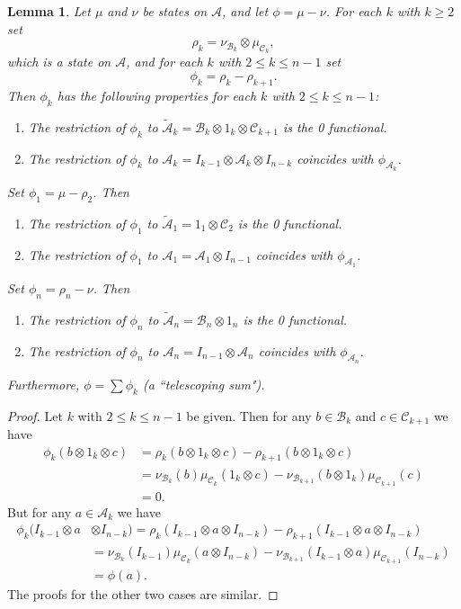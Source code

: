 \documentclass{amsart}[14pt]
\newtheorem{lemma}[theorem]{Lemma}
\theoremstyle{definition}
\theoremstyle{remark}
\newcommand{\cA}{{\mathcal A}}
\newcommand{\cB}{{\mathcal B}}
\newcommand{\cC}{{\mathcal C}}
\newcommand{\<}{\langle}
\renewcommand{\>}{\rangle}
\numberwithin{equation}{section}
\begin{document}
{\begin{lemma}
\label{lemsum}
Let $\mu$ and $\nu$ be states on $\cA$, and let $\phi = \mu - \nu$. 
For each $k$ with $k \geq 2$ set
\[
\rho_k = \nu_{\cB_k} \otimes \mu _{\cC_k},
\] 
which is a state on $\cA$,
and for each $k$ with $2 \leq k \leq n-1$ set
\[
 \phi_k = \rho_k - \rho_{k+1}.
 \]
Then $\phi_k$ has the following properties for 
each $k$ with $2 \leq k \leq n-1$:
\begin{enumerate}
\item
The restriction of $\phi_k$ to 
$\tilde \cA_k = \cB_k \otimes 1_k \otimes \cC_{k+1}$ is the
0 functional.
\item
The restriction of $\phi_k$ to $\cA_k = I_{k-1} \otimes \cA_k \otimes I_{n-k}$ coincides
with $\phi_{\cA_k}$.
\end{enumerate}
Set $\phi_1 = \mu - \rho_2$. Then
\begin{enumerate}
\item
The restriction of $\phi_1$ to $\tilde \cA_1 = 1_1 \otimes \cC_{2}$ is the
0 functional.
\item
The restriction of $\phi_1$ to $\cA_1 = \cA_1 \otimes I_{n-1}$ coincides
with $\phi_{\cA_1}$.
\end{enumerate}
Set $\phi_n = \rho_n  - \nu$. Then
\begin{enumerate}
\item
The restriction of $\phi_n$ to $\tilde \cA_n = \cB_n \otimes 1_n$ is the
0 functional.
\item
The restriction of $\phi_n$ to $\cA_n =  I_{n-1} \otimes  \cA_n$ coincides
with $\phi_{\cA_n}$.
\end{enumerate}
Furthermore, $\phi = \sum \phi_k$ (a ``telescoping sum").
\end{lemma}

\begin{proof}
Let $k$ with $2 \leq k \leq n-1$ be given. Then for any $b \in \cB_k$
and $c \in \cC_{k+1}$ we have
\begin{align*}
\phi_k(b \otimes 1_k \otimes c) & = \rho_k(b \otimes 1_k \otimes c)
- \rho_{k+1}(b \otimes 1_k \otimes c)    \\
& = \nu_{\cB_k}(b)\mu_{\cC_k}(1_k \otimes c)
-  \nu_{\cB_{k+1}}(b \otimes 1_k )\mu_{\cC_{k+1}}(c)   \\
& =0   .
\end{align*}
But for any $a \in \cA_k$ we have
\begin{align*}
\phi_k(I_{k-1}\otimes a & \otimes I_{n-k})  = \rho_k(I_{k-1}\otimes a \otimes I_{n-k})
- \rho_{k+1}(I_{k-1}\otimes a \otimes I_{n-k})    \\
& =   \nu_{\cB_k}(I_{k-1})
\mu_{\cC_k}(a \otimes I_{n-k})
-  \nu_{\cB_{k+1}}(I_{k-1} \otimes a )\mu_{\cC_{k+1}}(I_{n-k})   \\
& = \phi(a) .
\end{align*}
The proofs for the other two cases are similar.
\end{proof}

}
\end{document}
